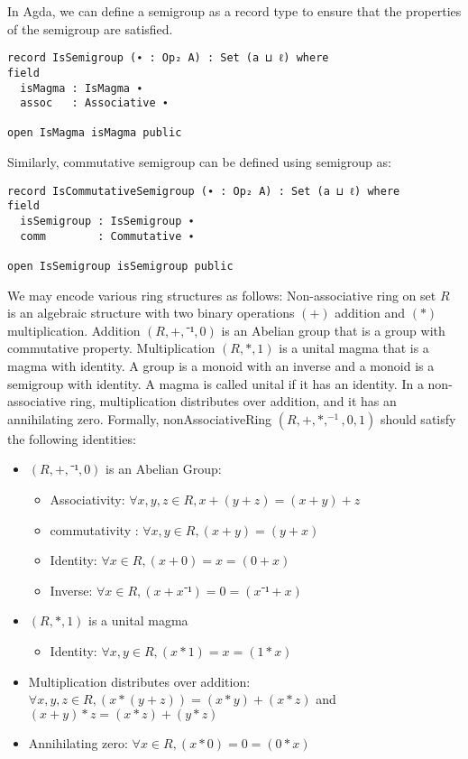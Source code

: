 In Agda, we can define a semigroup as a record type to ensure that the
properties of the semigroup are satisfied.

\begin{verbatim}
record IsSemigroup (∙ : Op₂ A) : Set (a ⊔ ℓ) where
field
  isMagma : IsMagma ∙
  assoc   : Associative ∙

open IsMagma isMagma public
\end{verbatim}

Similarly, commutative semigroup can be defined using semigroup as: 

\begin{verbatim}
record IsCommutativeSemigroup (∙ : Op₂ A) : Set (a ⊔ ℓ) where
field
  isSemigroup : IsSemigroup ∙
  comm        : Commutative ∙

open IsSemigroup isSemigroup public
\end{verbatim}

We may encode various ring structures as follows: Non-associative ring on set
$R$ is an algebraic structure with two binary operations $(+)$ addition and
$(*)$ multiplication. Addition $(R,+,⁻¹,0)$ is an Abelian group that is a group
with commutative property. Multiplication $(R,*,1)$ is a unital magma that is a
magma with identity. A group is a monoid with an inverse and a monoid is a
semigroup with identity. A magma is called unital if it has an identity. In a
non-associative ring, multiplication distributes over addition, and it has an
annihilating zero. Formally, nonAssociativeRing $(R,+,*,^{-1},0,1)$ should
satisfy the following identities:
\begin{itemize}
  \item $(R,+,⁻¹,0)$ is an Abelian Group:
   \begin{itemize}
    \item Associativity: $\forall x,y,z \in R, x + (y + z) = (x + y) + z$
    \item commutativity : $\forall x,y \in R, (x + y) = (y + x)$
    \item Identity: $\forall x \in R, (x + 0) = x = (0 + x)$
    \item Inverse: $\forall x \in R, (x + x⁻¹) = 0 = (x⁻¹ + x)$
  \end{itemize}
  \item $(R,*,1)$ is a unital magma
  \begin{itemize}
    \item Identity: $\forall x,y \in R, (x * 1) = x = (1 * x)$
  \end{itemize}
  \item Multiplication distributes over addition: \(\forall x , y , z \in R, (x * (y + z)) = (x * y) + (x
  * z)\) and \( (x + y) * z = (x * z) + (y * z) \)
  \item Annihilating zero: \(\forall x \in R, (x * 0) = 0 = (0 * x)\)
\end{itemize}

